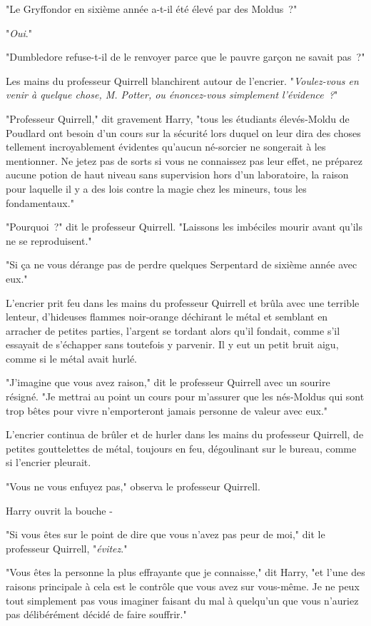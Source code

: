 "Le Gryffondor en sixième année a-t-il été élevé par des Moldus~?"

"\emph{Oui}."

"Dumbledore refuse-t-il de le renvoyer parce que le pauvre garçon ne savait pas~?"

Les mains du professeur Quirrell blanchirent autour de l'encrier. "\emph{Voulez-vous en venir à quelque chose, M. Potter, ou énoncez-vous simplement l'évidence~?}"

"Professeur Quirrell," dit gravement Harry, "tous les étudiants élevés-Moldu de Poudlard ont besoin d'un cours sur la sécurité lors duquel on leur dira des choses tellement incroyablement évidentes qu'aucun né-sorcier ne songerait à les mentionner. Ne jetez pas de sorts si vous ne connaissez pas leur effet, ne préparez aucune potion de haut niveau sans supervision hors d'un laboratoire, la raison pour laquelle il y a des lois contre la magie chez les mineurs, tous les fondamentaux."

"Pourquoi~?" dit le professeur Quirrell. "Laissons les imbéciles mourir avant qu'ils ne se reproduisent."

"Si ça ne vous dérange pas de perdre quelques Serpentard de sixième année avec eux."

L'encrier prit feu dans les mains du professeur Quirrell et brûla avec une terrible lenteur, d'hideuses flammes noir-orange déchirant le métal et semblant en arracher de petites parties, l'argent se tordant alors qu'il fondait, comme s'il essayait de s'échapper sans toutefois y parvenir. Il y eut un petit bruit aigu, comme si le métal avait hurlé.

"J'imagine que vous avez raison," dit le professeur Quirrell avec un sourire résigné. "Je mettrai au point un cours pour m'assurer que les nés-Moldus qui sont trop bêtes pour vivre n'emporteront jamais personne de valeur avec eux."

L'encrier continua de brûler et de hurler dans les mains du professeur Quirrell, de petites gouttelettes de métal, toujours en feu, dégoulinant sur le bureau, comme si l'encrier pleurait.

"Vous ne vous enfuyez pas," observa le professeur Quirrell.

Harry ouvrit la bouche -

"Si vous êtes sur le point de dire que vous n'avez pas peur de moi," dit le professeur Quirrell, "\emph{évitez}."

"Vous êtes la personne la plus effrayante que je connaisse," dit Harry, "et l'une des raisons principale à cela est le contrôle que vous avez sur vous-même. Je ne peux tout simplement pas vous imaginer faisant du mal à quelqu'un que vous n'auriez pas délibérément décidé de faire souffrir."

